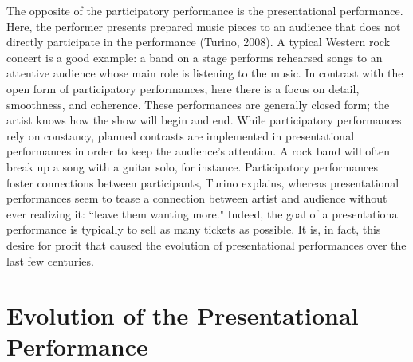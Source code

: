 The opposite of the participatory performance is the presentational performance. Here, the performer presents prepared music pieces to an audience that does not directly participate in the performance (Turino, 2008). A typical Western rock concert is a good example: a band on a stage performs rehearsed songs to an attentive audience whose main role is listening to the music. In contrast with the open form of participatory performances, here there is a focus on detail, smoothness, and coherence. These performances are generally closed form; the artist knows how the show will begin and end. While participatory performances rely on constancy, planned contrasts are implemented in presentational performances in order to keep the audience's attention. A rock band will often break up a song with a guitar solo, for instance. Participatory performances foster connections between participants, Turino explains, whereas presentational performances seem to tease a connection between artist and audience without ever realizing it: ``leave them wanting more." Indeed, the goal of a presentational performance is typically to sell as many tickets as possible. It is, in fact, this desire for profit that caused the evolution of presentational performances over the last few centuries.


\section{Evolution of the Presentational Performance}

